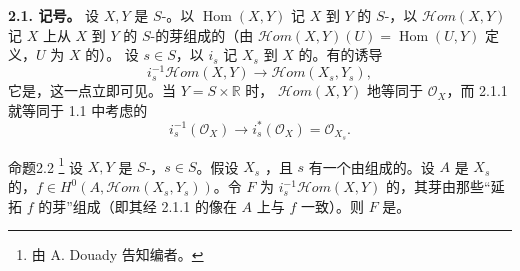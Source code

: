 \textbf{2.1. 记号。} 设 $X,Y$ 是 $S$-。以 $\operatorname{Hom}(X,Y)$ 记 $X$ 到 $Y$ 的 $S$-，以 $\mathcal Hom(X,Y)$ 记 $X$ 上从 $X$ 到 $Y$ 的 $S$-的芽组成的（由 $\mathcal Hom(X,Y)(U)=\operatorname{Hom}(U,Y)$ 定义，$U$ 为 $X$ 的）。
设 $s\in S$，以 $i_s$ 记 $X_s$ 到 $X$ 的。有的诱导
\[i_s^{-1}\mathcal Hom(X,Y)\longrightarrow\mathcal Hom(X_s,Y_s),\tag{2.1.1}\]
它是，这一点立即可见。当 $Y=S\times\mathbb R$ 时， $\mathcal Hom(X,Y)$ 地等同于 $\mathcal O_X$，而 2.1.1 就等同于 1.1 中考虑的
\[i_s^{-1}(\mathcal O_X)\longrightarrow i_s^*(\mathcal O_X)=\mathcal O_{X_s}.\]
\begin{SGAresult}{命题}{2.2}
\footnote{由 A. Douady 告知编者。}
设 $X,Y$ 是 $S$-，$s\in S$。假设 $X_s$ ，且 $s$ 有一个由组成的。设 $A$ 是 $X_s$ 的，$f\in H^0(A,\mathcal Hom(X_s,Y_s))$。令 $F$ 为 $i_s^{-1}\mathcal Hom(X,Y)$ 的，其芽由那些“延拓 $f$ 的芽”组成（即其经 2.1.1 的像在 $A$ 上与 $f$ 一致）。则 $F$ 是。
\end{SGAresult}
